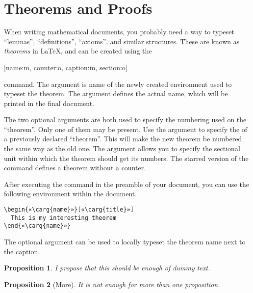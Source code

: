 \section{Theorems and Proofs}

When writing mathematical documents, you probably need a way to typeset
\enquote{lemmas}, \enquote{definitions}, \enquote{axioms}, and similar
structures. These are known as \emph{theorems} in \LaTeX{}, and can be created
using the
\begin{lscommand}
  [name:m, counter:o, caption:m, section:o]
\end{lscommand}
command. The  argument is name of the newly created environment used
to typeset the theorem. The  argument defines the actual name,
which will be printed in the final document.

The two optional arguments are both used to specify the numbering used on the
\enquote{theorem}. Only one of them may be present. Use the 
argument to specify the  of a previously declared \enquote{theorem}.
This will make the new theorem be numbered the same way as the old one. The
 argument allows you to specify the sectional unit within which
the theorem should get its numbers. The starred version of the command defines
a theorem without a counter.

After executing the  command in the preamble of your document,
you can use the following environment within the document.
\begin{verbatim}
\begin{«\carg{name}»}[«\carg{title}»]
  This is my interesting theorem
\end{«\carg{name}»}
\end{verbatim}
The optional  argument can be used to locally typeset the theorem
name next to the caption.
\begin{example}[standalone, paperheight=4cm]
\newtheorem{proposition}{Proposition}
\begin{proposition}
  I propose that this should
  be enough of dummy text.
\end{proposition}
\begin{proposition}[More]
  It is not enough for more
  than one proposition.
\end{proposition}
\end{example}


